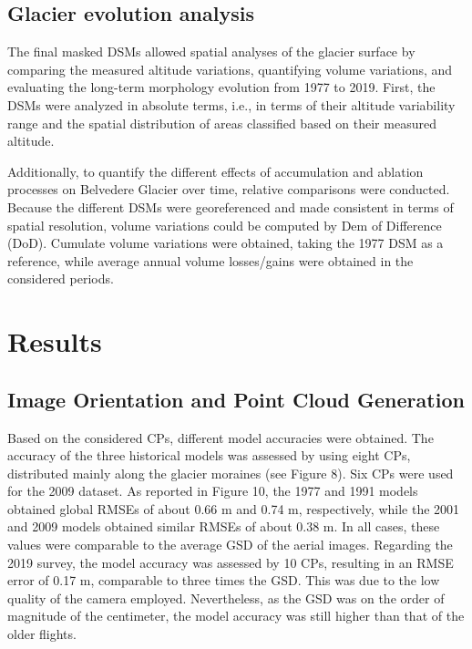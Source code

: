 \subsection{Glacier evolution analysis}{\label{sec:2:glacier_evolution}

The final masked DSMs allowed spatial analyses of the glacier surface by comparing the measured altitude variations, quantifying volume variations, and evaluating the long-term morphology evolution from 1977 to 2019. 
First, the DSMs were analyzed in absolute terms, i.e., in terms of their altitude variability range and the spatial distribution of areas classified based on their measured altitude. 

Additionally, to quantify the different effects of accumulation and ablation processes on Belvedere Glacier over time, relative comparisons were conducted.
Because the different DSMs were georeferenced and made consistent in terms of spatial resolution, volume variations could be computed by Dem of Difference (DoD).
Cumulate volume variations were obtained, taking the 1977 DSM as a reference, while average annual volume losses/gains were obtained in the considered periods.

\section{Results}\label{sec:2:results}

\subsection{Image Orientation and Point Cloud Generation}\label{sec:2:res_reconstruction}

Based on the considered CPs, different model accuracies were obtained. 
The accuracy of the three historical models was assessed by using eight CPs, distributed mainly along the glacier moraines (see Figure 8). 
Six CPs were used for the 2009 dataset. As reported in Figure 10, the 1977 and 1991 models obtained global RMSEs of about 0.66 m and 0.74 m, respectively, while the 2001 and 2009 models obtained similar RMSEs of about 0.38 m.
In all cases, these values were comparable to the average GSD of the aerial images. Regarding the 2019 survey, the model accuracy was assessed by 10 CPs, resulting in an RMSE error of 0.17 m, comparable to three times the GSD. 
This was due to the low quality of the camera employed. 
Nevertheless, as the GSD was on the order of magnitude of the centimeter, the model accuracy was still higher than that of the older flights.

}
